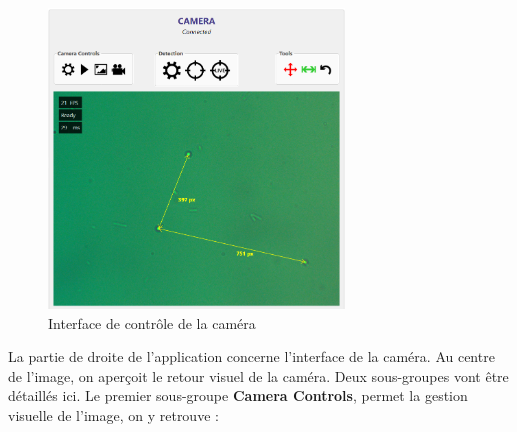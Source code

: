 \begin{figure}[H]
    \centering
    \includegraphics[width=0.7\textwidth]{assets/figures/Application_ServoVision/Measure_Tool.png}
    \caption{Interface de contrôle de la caméra}
    \label{Measure_Tool}
\end{figure}
La partie de droite de l'application concerne l'interface de la caméra. Au centre de l'image, on aperçoit le retour visuel de la caméra. Deux sous-groupes vont être détaillés ici.
\newpage
Le premier sous-groupe \textbf{Camera Controls}, permet la gestion visuelle de l'image, on y retrouve :
